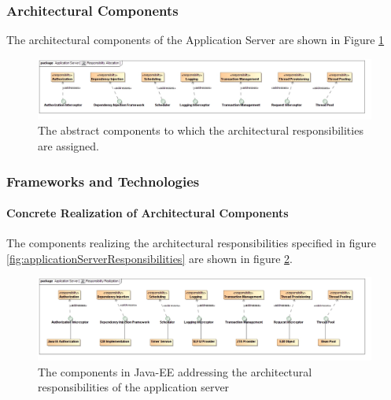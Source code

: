\subsubsection{Architectural Components}
The architectural components of the Application Server are shown in Figure \ref{fig:applicationServerResponsibilityAllocation}
\begin{figure}[H]
	\begin{center}
	\includegraphics[scale=0.4]{../Diagrams and Charts/Application Server/ResponsibilityAllocation.jpg}
	\caption{The abstract components to which the architectural responsibilities are assigned.}
	\label{fig:applicationServerResponsibilityAllocation}
	\end{center}
\end{figure}

\subsubsection{Frameworks and Technologies}
\paragraph{Concrete Realization of Architectural Components}
The components realizing the architectural responsibilities specified in figure \ref{fig:applicationServerResponsibilities} are shown in figure \ref{fig:applicationServerResponsibilityRealization}.
\begin{figure}[H]
	\begin{center}
	\includegraphics[scale=0.4]{../Diagrams and Charts/Application Server/ResponsibilityRealization.jpg}
	\caption{The components in Java-EE addressing the architectural responsibilities of the application server}
	\label{fig:applicationServerResponsibilityRealization}
	\end{center}
\end{figure}

